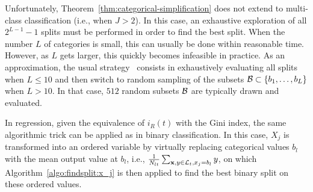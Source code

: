 Unfortunately, Theorem~\ref{thm:categorical-simplification} does not extend to
multi-class classification (i.e., when $J > 2$). In this case, an exhaustive
exploration of all $2^{L-1}-1$ splits must be performed in order
to find the best split.  When the number $L$ of categories is small, this can
usually be done  within reasonable time. However, as $L$ gets larger, this
quickly becomes infeasible in practice. As an approximation, the usual
strategy~\citep{liaw:2002} consists in exhaustively evaluating all splits when
$L \leq 10$ and then switch to random sampling of the subsets ${\cal B} \subset
\{ b_1, \dots, b_L \}$ when $L > 10$. In that case, $512$ random subsets ${\cal
B}$ are typically drawn and evaluated.

In regression, given the equivalence of $i_R(t)$ with the Gini index, the same
algorithmic trick can be applied as in binary classification. In this case,
$X_j$ is transformed into an ordered variable by virtually replacing
categorical values $b_l$ with the mean output value at $b_l$, i.e.,
$\tfrac{1}{N_{lt}} \sum_{\mathbf{x}, y \in {\cal L}_t, x_j = b_l} y$, on which
Algorithm~\ref{algo:findsplit:x_j} is then applied to find the best binary
split on these ordered values.

